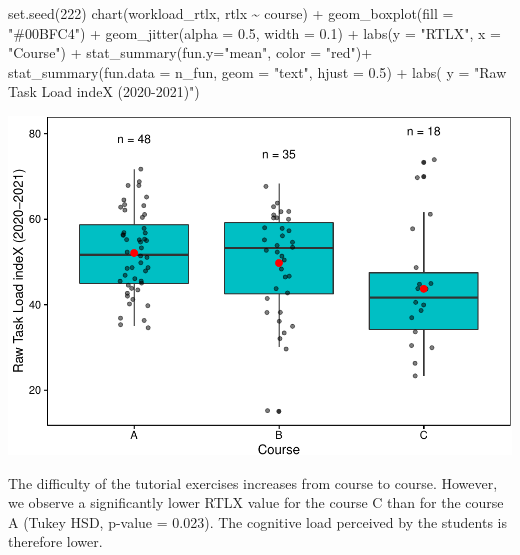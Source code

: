 \documentclass[
]{article}
\newenvironment{Shaded}{\begin{snugshade}}{\end{snugshade}}
\newcommand{\AttributeTok}[1]{\textcolor[rgb]{0.77,0.63,0.00}{#1}}
\newcommand{\DecValTok}[1]{\textcolor[rgb]{0.00,0.00,0.81}{#1}}
\newcommand{\FloatTok}[1]{\textcolor[rgb]{0.00,0.00,0.81}{#1}}
\newcommand{\FunctionTok}[1]{\textcolor[rgb]{0.00,0.00,0.00}{#1}}
\newcommand{\NormalTok}[1]{#1}
\newcommand{\SpecialCharTok}[1]{\textcolor[rgb]{0.00,0.00,0.00}{#1}}
\newcommand{\StringTok}[1]{\textcolor[rgb]{0.31,0.60,0.02}{#1}}
\begin{document}
\begin{Shaded}
\begin{Highlighting}[]
\FunctionTok{set.seed}\NormalTok{(}\DecValTok{222}\NormalTok{)}
\FunctionTok{chart}\NormalTok{(workload\_rtlx, rtlx }\SpecialCharTok{\textasciitilde{}}\NormalTok{ course) }\SpecialCharTok{+}
  \FunctionTok{geom\_boxplot}\NormalTok{(}\AttributeTok{fill =} \StringTok{"\#00BFC4"}\NormalTok{) }\SpecialCharTok{+}
  \FunctionTok{geom\_jitter}\NormalTok{(}\AttributeTok{alpha =} \FloatTok{0.5}\NormalTok{, }\AttributeTok{width =} \FloatTok{0.1}\NormalTok{) }\SpecialCharTok{+}
  \FunctionTok{labs}\NormalTok{(}\AttributeTok{y =} \StringTok{"RTLX"}\NormalTok{, }\AttributeTok{x =} \StringTok{"Course"}\NormalTok{) }\SpecialCharTok{+}
  \FunctionTok{stat\_summary}\NormalTok{(}\AttributeTok{fun.y=}\StringTok{"mean"}\NormalTok{, }\AttributeTok{color =} \StringTok{"red"}\NormalTok{)}\SpecialCharTok{+}
  \FunctionTok{stat\_summary}\NormalTok{(}\AttributeTok{fun.data =}\NormalTok{ n\_fun, }\AttributeTok{geom =} \StringTok{"text"}\NormalTok{, }\AttributeTok{hjust =} \FloatTok{0.5}\NormalTok{) }\SpecialCharTok{+}
  \FunctionTok{labs}\NormalTok{( }\AttributeTok{y =} \StringTok{"Raw Task Load indeX (2020{-}2021)"}\NormalTok{)}
\end{Highlighting}
\end{Shaded}

\includegraphics{teaching_data_science_files/figure-latex/unnamed-chunk-4-1.pdf}

The difficulty of the tutorial exercises increases from course to
course. However, we observe a significantly lower RTLX value for the
course C than for the course A (Tukey HSD, p-value = 0.023). The
cognitive load perceived by the students is therefore lower.
\end{document}
